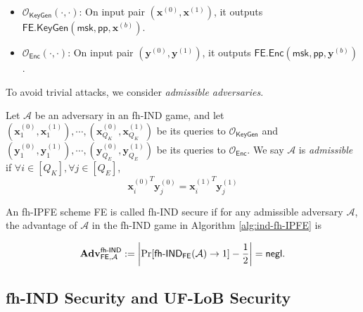 \begin{itemize}

	\item $\mathcal{O}_{\textsf{KeyGen}}(\cdot, \cdot)$: On input pair $(\mathbf{x}^{(0)}, \mathbf{x}^{(1)})$, it outputs $\textsf{FE.KeyGen}(\textsf{msk}, \textsf{pp}, \mathbf{x}^{(b)} )$.

	\item $\mathcal{O}_{\textsf{Enc}}(\cdot, \cdot)$: On input pair $(\mathbf{y}^{(0)}, \mathbf{y}^{(1)})$, it outputs $\textsf{FE.Enc}(\textsf{msk}, \textsf{pp}, \mathbf{y}^{(b)} )$.

\end{itemize}

\noindent To avoid trivial attacks, we consider \emph{admissible adversaries}.

\begin{definition}

	Let $\mathcal{A}$ be an adversary in an \textsf{fh-IND} game, and let $ (\mathbf{x}_1^{(0)}, \mathbf{x}_1^{(1)}), \cdots, (\mathbf{x}_{Q_K}^{(0)}, \mathbf{x}_{Q_K}^{(1)})$ be its queries to $\mathcal{O}_{\textsf{KeyGen}}$ and $(\mathbf{y}_1^{(0)}, \mathbf{y}_1^{(1)}), \cdots, (\mathbf{y}_{Q_E}^{(0)}, \mathbf{y}_{Q_E}^{(1)})$ be its queries to $\mathcal{O}_{\textsf{Enc}}$.
	We say $\mathcal{A}$ is \emph{admissible} if $\forall i \in [Q_K], \forall j \in [Q_E]$,
\[
	{\mathbf{x}^{(0)}_{i}}^T \mathbf{y}^{(0)}_{j} = {\mathbf{x}^{(1)}_{i}}^T \mathbf{y}^{(1)}_{j}
\]

\end{definition}



\begin{definition}

	An fh-IPFE scheme \textsf{FE} is called fh-IND secure if for any admissible adversary $\mathcal{A}$, the advantage of $\mathcal{A}$ in the fh-IND game in Algorithm \ref{alg:ind-fh-IPFE} is

\[
	\mathbf{Adv}_{\textsf{FE}, \mathcal{A}}^{\textsf{fh-IND}} := \left| \Pr[\textsf{fh-IND}_{\textsf{FE}}(\mathcal{A}) \to 1 ] - \frac{1}{2} \right| = \mathsf{negl}.
\]

\end{definition}


\subsection{fh-IND Security and UF-LoB Security}
\label{sec:ind-uf-lob}

